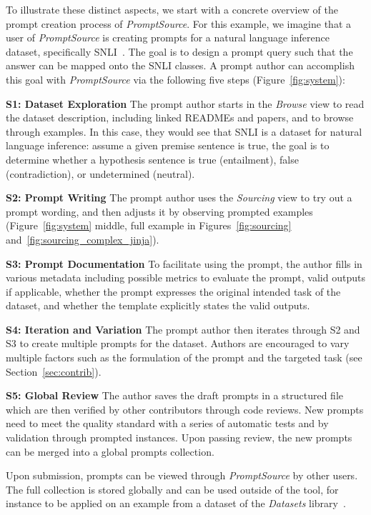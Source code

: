 To illustrate these distinct aspects, we start with a concrete overview of the prompt creation process  of \textit{PromptSource}.
For this example, we imagine that a user of \textit{PromptSource} is creating prompts for a natural language inference dataset, specifically SNLI~\citep{bowman-etal-2015-large}. The goal is to design a prompt query such that the answer can be mapped onto the SNLI classes. A prompt author can accomplish this goal with \textit{PromptSource} via the following five steps (Figure~\ref{fig:system}):

\textbf{S1: Dataset Exploration} The prompt author starts in the \emph{Browse} view to read the dataset description, including linked READMEs and papers, and to browse through examples. In this case, they would see that SNLI is a dataset for natural language inference: assume a given premise sentence is true, the goal is to determine whether a hypothesis sentence is true (entailment), false (contradiction), or undetermined (neutral). 

\textbf{S2: Prompt Writing} The prompt author uses the \emph{Sourcing} view to try out a prompt wording, and then adjusts it by observing prompted examples (Figure~\ref{fig:system} middle, full example in Figures~\ref{fig:sourcing} and~\ref{fig:sourcing_complex_jinja}).

\textbf{S3: Prompt Documentation} To facilitate using the prompt, the author fills in various metadata including possible metrics to evaluate the prompt, valid outputs if applicable, whether the prompt expresses the original intended task of the dataset, and whether the template explicitly states the valid outputs.

\textbf{S4: Iteration and Variation} The prompt author then iterates through S2 and S3 to create multiple prompts for the dataset. Authors are encouraged to vary multiple factors such as the formulation of the prompt and the targeted task (see Section~\ref{sec:contrib}).

\textbf{S5: Global Review} The author saves the draft prompts in a structured file which are then verified by other contributors through code reviews. New prompts need to meet the quality standard with a series of automatic tests and by validation through prompted instances. Upon passing review, the new prompts can be merged into a global prompts collection.

Upon submission, prompts can be viewed through \textit{PromptSource} by other users. The full collection is stored globally and can be used outside of the tool, for instance to be applied on an example from a dataset of the \textit{Datasets} library~\citep{lhoest-etal-2021-datasets}.

